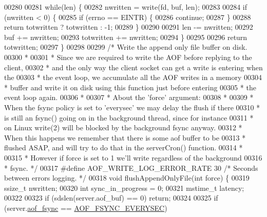 \begin{DoxyCode}
{{{00280 
00281     \textcolor{keywordflow}{while}(len) \{
00282         nwritten = write(fd, buf, len);
00283 
00284         \textcolor{keywordflow}{if} (nwritten < 0) \{
00285             \textcolor{keywordflow}{if} (errno == EINTR) \{
00286                 \textcolor{keywordflow}{continue};
00287             \}
00288             \textcolor{keywordflow}{return} totwritten ? totwritten : -1;
00289         \}
00290 
00291         len -= nwritten;
00292         buf += nwritten;
00293         totwritten += nwritten;
00294     \}
00295 
00296     \textcolor{keywordflow}{return} totwritten;
00297 \}
00298 
00299 \textcolor{comment}{/* Write the append only file buffer on disk.}
00300 \textcolor{comment}{ *}
00301 \textcolor{comment}{ * Since we are required to write the AOF before replying to the client,}
00302 \textcolor{comment}{ * and the only way the client socket can get a write is entering when the}
00303 \textcolor{comment}{ * the event loop, we accumulate all the AOF writes in a memory}
00304 \textcolor{comment}{ * buffer and write it on disk using this function just before entering}
00305 \textcolor{comment}{ * the event loop again.}
00306 \textcolor{comment}{ *}
00307 \textcolor{comment}{ * About the 'force' argument:}
00308 \textcolor{comment}{ *}
00309 \textcolor{comment}{ * When the fsync policy is set to 'everysec' we may delay the flush if there}
00310 \textcolor{comment}{ * is still an fsync() going on in the background thread, since for instance}
00311 \textcolor{comment}{ * on Linux write(2) will be blocked by the background fsync anyway.}
00312 \textcolor{comment}{ * When this happens we remember that there is some aof buffer to be}
00313 \textcolor{comment}{ * flushed ASAP, and will try to do that in the serverCron() function.}
00314 \textcolor{comment}{ *}
00315 \textcolor{comment}{ * However if force is set to 1 we'll write regardless of the background}
00316 \textcolor{comment}{ * fsync. */}
00317 \textcolor{preprocessor}{#}\textcolor{preprocessor}{define} \textcolor{preprocessor}{AOF\_WRITE\_LOG\_ERROR\_RATE} 30 \textcolor{comment}{/* Seconds between errors logging. */}
00318 \textcolor{keywordtype}{void} flushAppendOnlyFile(\textcolor{keywordtype}{int} force) \{
00319     ssize\_t nwritten;
00320     \textcolor{keywordtype}{int} sync\_in\_progress = 0;
00321     mstime\_t latency;
00322 
00323     \textcolor{keywordflow}{if} (sdslen(server.aof\_buf) == 0) \textcolor{keywordflow}{return};
00324 
00325     \textcolor{keywordflow}{if} (server.\hyperlink{config_8h_af5994c643c434574580bb7816af82cad}{aof\_fsync} == \hyperlink{server_8h_a9784233b87ec796d0343556106fb778e}{AOF\_FSYNC\_EVERYSEC})
}}}
\end{DoxyCode}
